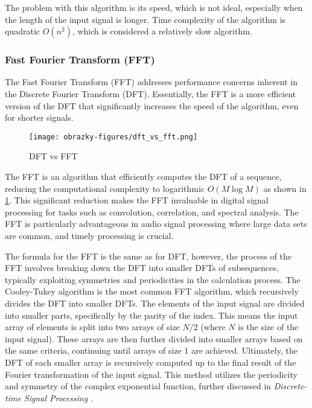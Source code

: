 The problem with this algorithm is its speed, which is not ideal, especially when the length of the input signal is longer. Time complexity of the algorithm is quadratic \( O(n^2) \), which is considered a relatively slow algorithm.

\subsubsection{Fast Fourier Transform (FFT)}
The Fast Fourier Transform (FFT) addresses performance concerns inherent in the Discrete Fourier Transform (DFT). Essentially, the FFT is a more efficient version of the DFT that significantly increases the speed of the algorithm, even for shorter signals. 

\begin{figure}[h]
    \centering
    \texttt{[image: obrazky-figures/dft\_vs\_fft.png]}
    \caption{DFT vs FFT}
    \label{fig:dft-vs-fft}
\end{figure}

The FFT is an algorithm that efficiently computes the DFT of a sequence, reducing the computational complexity to logarithmic \( O(M \log M) \) as shown in \ref{fig:dft-vs-fft}. This significant reduction makes the FFT invaluable in digital signal processing for tasks such as convolution, correlation, and spectral analysis. The FFT is particularly advantageous in audio signal processing where large data sets are common, and timely processing is crucial.

The formula for the FFT is the same as for DFT, however, the process of the FFT involves breaking down the DFT into smaller DFTs of subsequences, typically exploiting symmetries and periodicities in the calculation process. The Cooley-Tukey algorithm is the most common FFT algorithm, which recursively divides the DFT into smaller DFTs. The elements of the input signal are divided into smaller parts, specifically by the parity of the index. This means the input array of elements is split into two arrays of size \( N/2 \) (where \( N \) is the size of the input signal). These arrays are then further divided into smaller arrays based on the same criteria, continuing until arrays of size 1 are achieved. Ultimately, the DFT of each smaller array is recursively computed up to the final result of the Fourier transformation of the input signal. This method utilizes the periodicity and symmetry of the complex exponential function, further discussed in \textit{Discrete-time Signal Processing} \cite{Oppenheim1998}.

